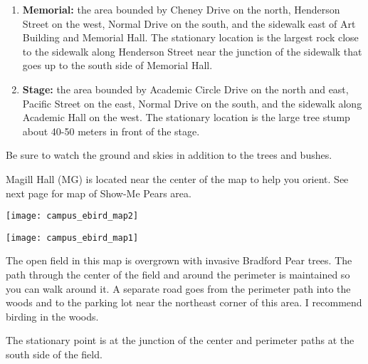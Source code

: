 \documentclass[12pt]{article}
\begin{document}
\begin{enumerate}
\item \textbf{Memorial:} the area bounded by Cheney Drive on the north, Henderson Street on the west, Normal Drive on the south, and the sidewalk east of Art Building and Memorial Hall. The stationary location is the largest rock close to the sidewalk along Henderson Street near the junction of the sidewalk that goes up to the south side of Memorial Hall.

\item \textbf{Stage:} the area bounded by Academic Circle Drive on the north and east, Pacific Street on the east, Normal Drive on the south, and the sidewalk along Academic Hall on the west. The stationary location is the large tree stump about 40-50 meters in front of the stage.
\end{enumerate}

Be sure to watch the ground and skies in addition to the trees and bushes.


\newpage

Magill Hall (MG) is located near the center of the map to help you orient. See next page for map of Show-Me Pears area.

\texttt{[image: campus\_ebird\_map2]}

\newpage

\texttt{[image: campus\_ebird\_map1]}

The open field in this map is overgrown with invasive Bradford Pear trees. The path through the center of the field and around the perimeter is maintained so you can walk around it. A separate road goes from the perimeter path into the woods and to the parking lot near the northeast corner of this area. I recommend birding in the woods.

The stationary point is at the junction of the center and perimeter paths at the south side of the field.
\end{document}
